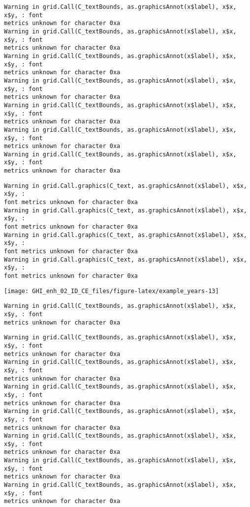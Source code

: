 \documentclass[
  10pt,
  a4paper,oneside]{article}
\begin{document}
\begin{verbatim}
Warning in grid.Call(C_textBounds, as.graphicsAnnot(x$label), x$x, x$y, : font
metrics unknown for character 0xa
Warning in grid.Call(C_textBounds, as.graphicsAnnot(x$label), x$x, x$y, : font
metrics unknown for character 0xa
Warning in grid.Call(C_textBounds, as.graphicsAnnot(x$label), x$x, x$y, : font
metrics unknown for character 0xa
Warning in grid.Call(C_textBounds, as.graphicsAnnot(x$label), x$x, x$y, : font
metrics unknown for character 0xa
Warning in grid.Call(C_textBounds, as.graphicsAnnot(x$label), x$x, x$y, : font
metrics unknown for character 0xa
Warning in grid.Call(C_textBounds, as.graphicsAnnot(x$label), x$x, x$y, : font
metrics unknown for character 0xa
Warning in grid.Call(C_textBounds, as.graphicsAnnot(x$label), x$x, x$y, : font
metrics unknown for character 0xa
\end{verbatim}

\begin{verbatim}
Warning in grid.Call.graphics(C_text, as.graphicsAnnot(x$label), x$x, x$y, :
font metrics unknown for character 0xa
Warning in grid.Call.graphics(C_text, as.graphicsAnnot(x$label), x$x, x$y, :
font metrics unknown for character 0xa
Warning in grid.Call.graphics(C_text, as.graphicsAnnot(x$label), x$x, x$y, :
font metrics unknown for character 0xa
Warning in grid.Call.graphics(C_text, as.graphicsAnnot(x$label), x$x, x$y, :
font metrics unknown for character 0xa
\end{verbatim}

\begin{center}\texttt{[image: GHI\_enh\_02\_ID\_CE\_files/figure-latex/example\_years-13]} \end{center}

\begin{verbatim}
Warning in grid.Call(C_textBounds, as.graphicsAnnot(x$label), x$x, x$y, : font
metrics unknown for character 0xa
\end{verbatim}

\begin{verbatim}
Warning in grid.Call(C_textBounds, as.graphicsAnnot(x$label), x$x, x$y, : font
metrics unknown for character 0xa
Warning in grid.Call(C_textBounds, as.graphicsAnnot(x$label), x$x, x$y, : font
metrics unknown for character 0xa
Warning in grid.Call(C_textBounds, as.graphicsAnnot(x$label), x$x, x$y, : font
metrics unknown for character 0xa
Warning in grid.Call(C_textBounds, as.graphicsAnnot(x$label), x$x, x$y, : font
metrics unknown for character 0xa
Warning in grid.Call(C_textBounds, as.graphicsAnnot(x$label), x$x, x$y, : font
metrics unknown for character 0xa
Warning in grid.Call(C_textBounds, as.graphicsAnnot(x$label), x$x, x$y, : font
metrics unknown for character 0xa
Warning in grid.Call(C_textBounds, as.graphicsAnnot(x$label), x$x, x$y, : font
metrics unknown for character 0xa
\end{verbatim}
\end{document}

